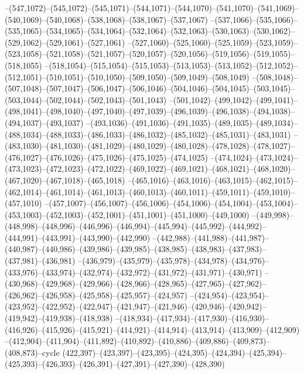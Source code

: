 --(547,1072)--(545,1072)--(545,1071)--(544,1071)--(544,1070)--(541,1070)--(541,1069)--(540,1069)--(540,1068)--(538,1068)--(538,1067)--(537,1067)
--(537,1066)--(535,1066)--(535,1065)--(534,1065)--(534,1064)--(532,1064)--(532,1063)--(530,1063)--(530,1062)--(529,1062)--(529,1061)--(527,1061)
--(527,1060)--(525,1060)--(525,1059)--(523,1059)--(523,1058)--(521,1058)--(521,1057)--(520,1057)--(520,1056)--(519,1056)--(519,1055)--(518,1055)
--(518,1054)--(515,1054)--(515,1053)--(513,1053)--(513,1052)--(512,1052)--(512,1051)--(510,1051)--(510,1050)--(509,1050)--(509,1049)--(508,1049)
--(508,1048)--(507,1048)--(507,1047)--(506,1047)--(506,1046)--(504,1046)--(504,1045)--(503,1045)--(503,1044)--(502,1044)--(502,1043)--(501,1043)
--(501,1042)--(499,1042)--(499,1041)--(498,1041)--(498,1040)--(497,1040)--(497,1039)--(496,1039)--(496,1038)--(494,1038)--(494,1037)--(493,1037)
--(493,1036)--(491,1036)--(491,1035)--(489,1035)--(489,1034)--(488,1034)--(488,1033)--(486,1033)--(486,1032)--(485,1032)--(485,1031)--(483,1031)
--(483,1030)--(481,1030)--(481,1029)--(480,1029)--(480,1028)--(478,1028)--(478,1027)--(476,1027)--(476,1026)--(475,1026)--(475,1025)--(474,1025)
--(474,1024)--(473,1024)--(473,1023)--(472,1023)--(472,1022)--(469,1022)--(469,1021)--(468,1021)--(468,1020)--(467,1020)--(467,1018)--(465,1018)
--(465,1016)--(463,1016)--(463,1015)--(462,1015)--(462,1014)--(461,1014)--(461,1013)--(460,1013)--(460,1011)--(459,1011)--(459,1010)--(457,1010)
--(457,1007)--(456,1007)--(456,1006)--(454,1006)--(454,1004)--(453,1004)--(453,1003)--(452,1003)--(452,1001)--(451,1001)--(451,1000)--(449,1000)
--(449,998)--(448,998)--(448,996)--(446,996)--(446,994)--(445,994)--(445,992)--(444,992)--(444,991)--(443,991)--(443,990)--(442,990)
--(442,988)--(441,988)--(441,987)--(440,987)--(440,986)--(439,986)--(439,985)--(438,985)--(438,983)--(437,983)--(437,981)--(436,981)
--(436,979)--(435,979)--(435,978)--(434,978)--(434,976)--(433,976)--(433,974)--(432,974)--(432,972)--(431,972)--(431,971)--(430,971)
--(430,968)--(429,968)--(429,966)--(428,966)--(428,965)--(427,965)--(427,962)--(426,962)--(426,958)--(425,958)--(425,957)--(424,957)
--(424,954)--(423,954)--(423,952)--(422,952)--(422,947)--(421,947)--(421,946)--(420,946)--(420,942)--(419,942)--(419,938)--(418,938)
--(418,934)--(417,934)--(417,930)--(416,930)--(416,926)--(415,926)--(415,921)--(414,921)--(414,914)--(413,914)--(413,909)--(412,909)
--(412,904)--(411,904)--(411,892)--(410,892)--(410,886)--(409,886)--(409,873)--(408,873)--cycle
(422,397)--(423,397)--(423,395)--(424,395)--(424,394)--(425,394)--(425,393)--(426,393)--(426,391)--(427,391)--(427,390)--(428,390)
